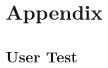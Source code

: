 \documentclass[../main.tex]{subfiles}
\begin{document}
\section{Appendix}
\label{sec:appendix}

\subsection{User Test}
\label{sec:user_test}
\end{document}
